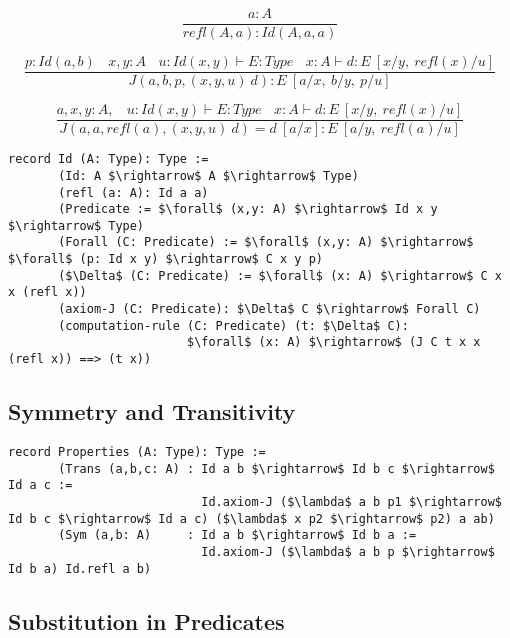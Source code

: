 \documentclass[11pt,oneside]{article}
\begin{document}
\begin{equation}
\tag{$Id$-intro}
\dfrac
  {a:A}
  {refl(A,a) : Id(A,a,a) }
\end{equation}

\begin{equation}
\tag{$J$-elimination}
\dfrac
  {p:Id(a,b)\ \ \ \ x,y:A\ \ \ \ u:Id(x,y) \vdash E:Type\ \ \ \ x:A \vdash d: E\ [x/y,\ refl(x)/u]}
  {J(a,b,p,(x,y,u)\ d) : E\ [a/x,\ b/y,\ p/u]}
\end{equation}

\begin{equation}
\tag{$Id$-computation}
\dfrac
  {a,x,y:A,\ \ \ \ u:Id(x,y) \vdash E:Type\ \ \ \ x:A \vdash d:E\ [x/y,\ refl(x)/u]}
  {J(a,a,refl(a),(x,y,u)\ d) = d\ [a/x] : E\ [a/y,\ refl(a)/u]}
\end{equation}

\begin{lstlisting}[mathescape=true]
record Id (A: Type): Type :=
       (Id: A $\rightarrow$ A $\rightarrow$ Type)
       (refl (a: A): Id a a)
       (Predicate := $\forall$ (x,y: A) $\rightarrow$ Id x y $\rightarrow$ Type)
       (Forall (C: Predicate) := $\forall$ (x,y: A) $\rightarrow$ $\forall$ (p: Id x y) $\rightarrow$ C x y p)
       ($\Delta$ (C: Predicate) := $\forall$ (x: A) $\rightarrow$ C x x (refl x))
       (axiom-J (C: Predicate): $\Delta$ C $\rightarrow$ Forall C)
       (computation-rule (C: Predicate) (t: $\Delta$ C):
                         $\forall$ (x: A) $\rightarrow$ (J C t x x (refl x)) ==> (t x))
\end{lstlisting}

\newpage
\subsection{Symmetry and Transitivity}

\begin{lstlisting}[mathescape=true]
record Properties (A: Type): Type :=
       (Trans (a,b,c: A) : Id a b $\rightarrow$ Id b c $\rightarrow$ Id a c :=
                           Id.axiom-J ($\lambda$ a b p1 $\rightarrow$ Id b c $\rightarrow$ Id a c) ($\lambda$ x p2 $\rightarrow$ p2) a ab)
       (Sym (a,b: A)     : Id a b $\rightarrow$ Id b a :=
                           Id.axiom-J ($\lambda$ a b p $\rightarrow$ Id b a) Id.refl a b)
\end{lstlisting}

\subsection{Substitution in Predicates}
\end{document}
